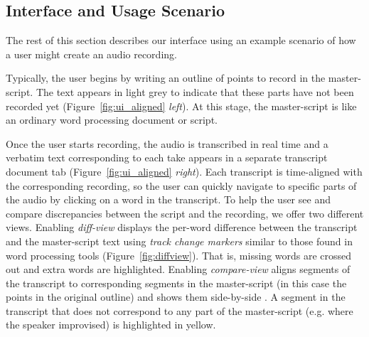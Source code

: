
\subsection{Interface and Usage Scenario}
The rest of this section describes our interface using an example scenario of how a user might create an audio recording. 

Typically, the user begins by writing an outline of points to record in the master-script.
The text appears in light grey to indicate that these parts have not been recorded yet (Figure~\ref{fig:ui_aligned} \textit{left}). At this stage, the master-script is like an ordinary word processing document or script. 

Once the user starts recording, the audio is transcribed in real time and a verbatim text corresponding to each take appears in a separate transcript document tab (Figure~\ref{fig:ui_aligned} \textit{right}). Each transcript is time-aligned with the corresponding recording, so the user can quickly navigate to specific
parts of the audio by clicking on a word in the transcript. To help the user see and compare discrepancies between the script and the recording, we offer two different views.
Enabling \textit{diff-view} displays the per-word difference between the transcript and the master-script text using  \textit{track change markers} similar to those found in word processing tools (Figure~\ref{fig:diffview}). That is, missing words are crossed out and extra words are highlighted. Enabling \textit{compare-view} aligns segments of the transcript to corresponding segments in the master-script (in this case the points in the original outline) and shows them side-by-side . A segment in the transcript that does not correspond to any part of the master-script (e.g. where the speaker improvised) is highlighted in yellow.


